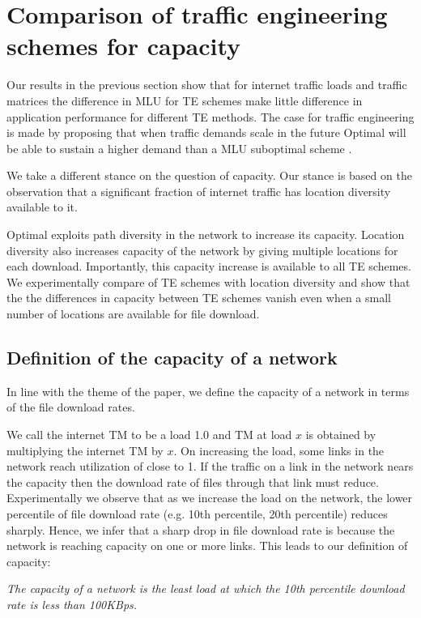 \section{Comparison of traffic engineering schemes for capacity}

Our results in the previous section show that for internet traffic loads and traffic matrices the difference in MLU for TE schemes make little difference in application performance for different TE methods. The case for traffic engineering is made by proposing that when traffic demands scale in the future Optimal will be able to sustain a higher demand than a MLU suboptimal scheme \cite{TeXCP06}.

We take a different stance on the question of capacity. Our stance is based on the observation that a significant fraction of internet traffic has location diversity available to it.

Optimal exploits path diversity in the network to increase its capacity. Location diversity also increases capacity of the network by giving multiple locations for each download. Importantly, this capacity increase is available to all TE schemes. We experimentally compare of TE schemes with location diversity and show that the the differences in capacity between TE schemes vanish even when a small number of locations are available for file download.

\subsection{Definition of the capacity of a network}

In line with the theme of the paper, we define the capacity of a network in terms of the file download rates. 

We call the internet TM to be a load 1.0 and TM at load $x$ is obtained by multiplying the internet TM by $x$. On increasing the load, some links in the network reach utilization of close to 1. If the traffic on a link in the network nears the capacity then the download rate of files through that link must reduce.  Experimentally we observe that as we increase the load on the network, the lower percentile of file download rate (e.g. 10th percentile, 20th percentile) reduces sharply. Hence, we infer that a sharp drop in file download rate is because the network is reaching capacity on one or more links. This leads to our definition of capacity:

\emph{The capacity of a network is the least load at which the 10th percentile download rate is less than 100KBps.}

